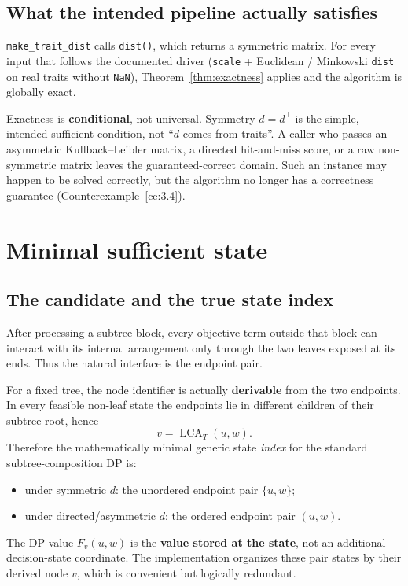 \documentclass[11pt]{article}
\theoremstyle{plain}
\newcommand{\LCA}{\operatorname{LCA}}
\begin{document}
\subsection{What the intended pipeline actually satisfies}

\texttt{make\_trait\_dist} calls \texttt{dist()}, which returns a symmetric
matrix. For every input that follows the documented driver (\texttt{scale} +
Euclidean / Minkowski \texttt{dist} on real traits without \texttt{NaN}),
Theorem~\ref{thm:exactness} applies and the algorithm is globally exact.

Exactness is \textbf{conditional}, not universal. Symmetry \(d=d^\top\) is the
simple, intended sufficient condition, not ``\(d\) comes from traits''. A
caller who passes an asymmetric Kullback--Leibler matrix, a directed hit-and-miss
score, or a raw non-symmetric matrix leaves the guaranteed-correct domain. Such
an instance may happen to be solved correctly, but the algorithm no longer has
a correctness guarantee (Counterexample~\ref{ce:3.4}).

\section{Minimal sufficient state}
\label{sec:state}

\subsection{The candidate and the true state index}

After processing a subtree block, every objective term outside that block can
interact with its internal arrangement only through the two leaves exposed at
its ends. Thus the natural interface is the endpoint pair.

For a fixed tree, the node identifier is actually \textbf{derivable} from the
two endpoints. In every feasible non-leaf state the endpoints lie in different
children of their subtree root, hence
\[
v=\LCA_T(u,w).
\]
Therefore the mathematically minimal generic state \emph{index} for the
standard subtree-composition DP is:

\begin{itemize}
\item under symmetric \(d\): the unordered endpoint pair \(\{u,w\}\);
\item under directed/asymmetric \(d\): the ordered endpoint pair \((u,w)\).
\end{itemize}

The DP value \(F_v(u,w)\) is the \textbf{value stored at the state}, not an
additional decision-state coordinate. The implementation organizes these pair
states by their derived node \(v\), which is convenient but logically
redundant.
\end{document}

